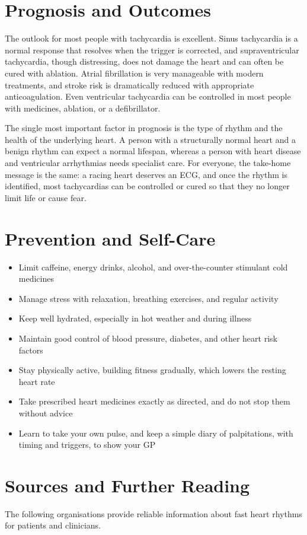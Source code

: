 \section*{Prognosis and Outcomes}
The outlook for most people with tachycardia is excellent. Sinus tachycardia is a normal response that resolves when the trigger is corrected, and supraventricular tachycardia, though distressing, does not damage the heart and can often be cured with ablation. Atrial fibrillation is very manageable with modern treatments, and stroke risk is dramatically reduced with appropriate anticoagulation. Even ventricular tachycardia can be controlled in most people with medicines, ablation, or a defibrillator.

The single most important factor in prognosis is the type of rhythm and the health of the underlying heart. A person with a structurally normal heart and a benign rhythm can expect a normal lifespan, whereas a person with heart disease and ventricular arrhythmias needs specialist care. For everyone, the take-home message is the same: a racing heart deserves an ECG, and once the rhythm is identified, most tachycardias can be controlled or cured so that they no longer limit life or cause fear.

\section*{Prevention and Self-Care}
\begin{itemize}
    \item Limit caffeine, energy drinks, alcohol, and over-the-counter stimulant cold medicines
    \item Manage stress with relaxation, breathing exercises, and regular activity
    \item Keep well hydrated, especially in hot weather and during illness
    \item Maintain good control of blood pressure, diabetes, and other heart risk factors
    \item Stay physically active, building fitness gradually, which lowers the resting heart rate
    \item Take prescribed heart medicines exactly as directed, and do not stop them without advice
    \item Learn to take your own pulse, and keep a simple diary of palpitations, with timing and triggers, to show your GP
\end{itemize}

\section*{Sources and Further Reading}
The following organisations provide reliable information about fast heart rhythms for patients and clinicians.


